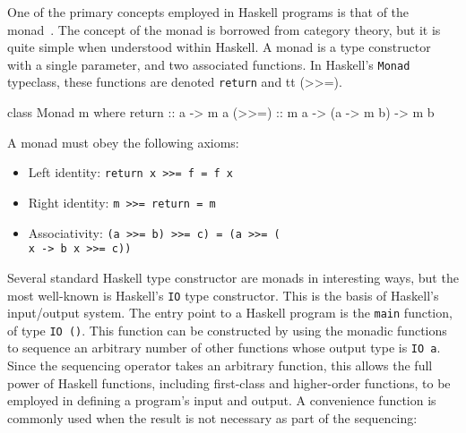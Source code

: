 One of the primary concepts employed in Haskell programs is that of the
monad~\cite{PeytonJones1993,PeytonJones2001}. The concept of the monad is
borrowed from category theory, but it is quite simple when understood within
Haskell. A monad is a type constructor with a single parameter, and two
associated functions. In Haskell's {\tt Monad} typeclass, these functions are
denoted {\tt return} and {tt (>>=)}.

\begin{code}
class Monad m where
  return :: a -> m a
  (>>=)  :: m a -> (a -> m b) -> m b
\end{code}

A monad must obey the following axioms:
\begin{itemize}
\item Left identity: {\tt return x >>= f = f x}
\item Right identity: {\tt m >>= return = m}
\item Associativity: {\tt (a >>= b) >>= c) = (a >>= (\\x -> b x >>= c))}
\end{itemize}

Several standard Haskell type constructor are monads in interesting ways, but
the most well-known is Haskell's {\tt IO} type constructor. This is the basis of
Haskell's input/output system. The entry point to a Haskell program is the
{\tt main} function, of type {\tt IO ()}. This function can be constructed by
using the monadic functions to sequence an arbitrary number of other functions
whose output type is {\tt IO a}. Since the sequencing operator takes an
arbitrary function, this allows the full power of Haskell functions, including
first-class and higher-order functions, to be employed in defining a program's
input and output. A convenience function is commonly used when the result is not
necessary as part of the sequencing:

